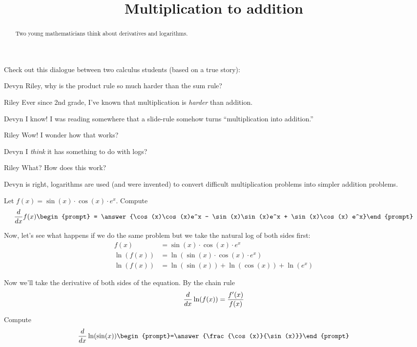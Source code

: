 \documentclass{ximera}
\title[Break-Ground:]{Multiplication to addition}
\begin{document}
\begin{abstract}
Two young mathematicians think about derivatives and logarithms.
\end{abstract}
\maketitle


Check out this dialogue between two calculus students (based on a true
story):

\begin{dialogue}
\item[Devyn] Riley, why is the product rule so much harder than the sum rule?
\item[Riley] Ever since 2nd grade, I've known that multiplication is
  \textit{harder} than addition.
\item[Devyn] I know! I was reading somewhere that a slide-rule somehow
  turns ``multiplication into addition.''
\item[Riley] Wow! I wonder how that works?
\item[Devyn] I \textit{think} it has something to do with logs?
\item[Riley] What? How does this work?
\end{dialogue}

Devyn is right, logarithms are used (and were invented) to convert
difficult multiplication problems into simpler addition problems.

\begin{problem}
  Let $f(x) = \sin(x) \cdot \cos(x) \cdot e^x$. Compute
  \[
  \ddx f(x)\begin{prompt} = \answer{\cos(x)\cos(x)e^x - \sin(x)\sin(x)e^x + \sin(x)\cos(x) e^x}\end{prompt}
  \]
\end{problem}

Now, let's see what happens if we do the same problem but we take the
natural log of both sides first:
\begin{align*}
  f(x) &= \sin(x)\cdot\cos(x)\cdot e^x\\
  \ln(f(x)) &= \ln(\sin(x)\cdot\cos(x)\cdot e^x)\\
  \ln(f(x)) &=\ln(\sin(x)) + \ln(\cos(x)) + \ln(e^x)
\end{align*}

Now we'll take the derivative of both sides of the equation.
By the chain rule
\[
\frac{d}{\mathop{}\!d x} \ln(f(x))= \frac{f'(x)}{f(x)}
\]


\begin{problem}
  Compute %
  \[
  \ddx \ln(\sin(x))  \begin{prompt}=\answer{\frac{\cos(x)}{\sin(x)}}\end{prompt}
  \]
\end{problem}
\end{document}
